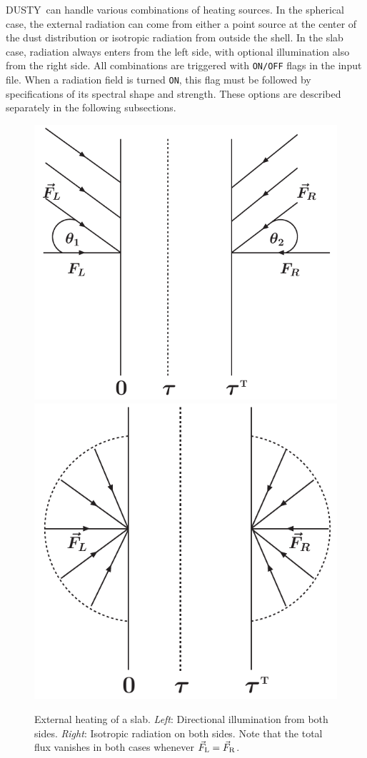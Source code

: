 \documentclass[11pt]{article}
\def\D    {{\sf DUSTY}}
\begin{document}
\D\ can handle various combinations of heating sources. In the
spherical case, the external radiation can come from either a point
source at the center of the dust distribution or isotropic radiation
from outside the shell. In the slab case, radiation always enters from
the left side, with optional illumination also from the right side.
All combinations are triggered with {\tt ON/OFF} flags in the input
file. When a radiation field is turned {\tt ON}, this flag must be
followed by specifications of its spectral shape and strength. These
options are described separately in the following subsections.

\newpage
\begin{figure}[hbtp]
  \centering
  \includegraphics[width=0.35\hsize]{slab_dir}
  \hspace{1in}
  \includegraphics[width=0.35\hsize]{slab_iso}

  \caption{External heating of a slab. {\em Left}: Directional
    illumination from both sides. {\em Right}: Isotropic radiation on
    both sides. Note that the total flux vanishes in both cases
    whenever $\vec F_{\rm L} = \vec F_{\rm R}$.}
  \label{fig:slab}
\end{figure}
\end{document}

